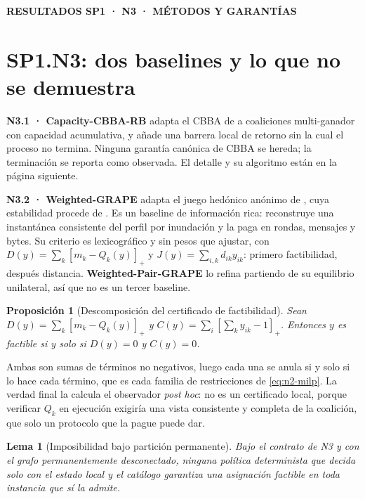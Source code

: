 \documentclass[12pt,a4paper]{article}
\newcommand{\leveltag}[1]{%
  \noindent\colorbox{VIUDark}{%
    \parbox{\dimexpr\textwidth-2\fboxsep\relax}{%
      \color{white}\sffamily\bfseries\small #1%
    }%
  }\par\smallskip
}
\newtheorem{n1prop}{Proposición}
\newtheorem{n1lema}{Lema}
\begin{document}
\clearpage

\leveltag{RESULTADOS SP1 · N3 · MÉTODOS Y GARANTÍAS}
\section*{SP1.N3: dos baselines y lo que no se demuestra}

\textbf{N3.1 · Capacity-CBBA-RB} adapta el CBBA de
\textcite{choiBrunetHow2009CBBA} a coaliciones multi-ganador con capacidad
acumulativa, y añade una barrera local de retorno sin la cual el proceso no
termina. Ninguna garantía canónica de CBBA se hereda; la terminación se reporta
como observada. El detalle y su algoritmo están en la página siguiente.

\textbf{N3.2 · Weighted-GRAPE} adapta el juego hedónico anónimo de
\textcite{jangShinTsourdos2018GRAPE}, cuya estabilidad procede de
\textcite{bogomolnaiaJackson2002Hedonic}. Es un baseline de información rica:
reconstruye una instantánea consistente del perfil por inundación y la paga en
rondas, mensajes y bytes. Su criterio es lexicográfico y sin pesos que ajustar,
con $D(y)=\sum_k[m_k-Q_k(y)]_+$ y $J(y)=\sum_{i,k}d_{ik}y_{ik}$: primero
factibilidad, después distancia. \textbf{Weighted-Pair-GRAPE} lo refina partiendo
de su equilibrio unilateral, así que no es un tercer baseline.

\begin{n1prop}[Descomposición del certificado de factibilidad]
\label{prop:n3-cert}
Sean $D(y)=\sum_k[m_k-Q_k(y)]_+$ y $C(y)=\sum_i[\sum_ky_{ik}-1]_+$. Entonces $y$ es
factible si y solo si $D(y)=0$ y $C(y)=0$.
\end{n1prop}

Ambas son sumas de términos no negativos, luego cada una se anula si y solo si lo
hace cada término, que es cada familia de restricciones de \eqref{eq:n2-milp}. La
verdad final la calcula el observador \emph{post hoc}: no es un certificado local,
porque verificar $Q_k$ en ejecución exigiría una vista consistente y completa de
la coalición, que solo un protocolo que la pague puede dar.

\begin{n1lema}[Imposibilidad bajo partición permanente]
\label{lema:n3-partition}
Bajo el contrato de N3 y con el grafo permanentemente desconectado, ninguna
política determinista que decida solo con el estado local y el catálogo
garantiza una asignación factible en toda instancia que sí la admite.
\end{n1lema}
\end{document}
